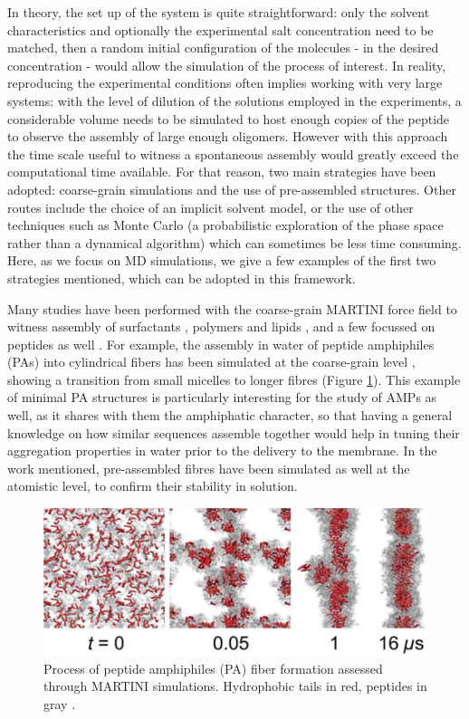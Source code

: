 In theory, the set up of the system is quite straightforward: only the solvent characteristics and optionally the experimental salt concentration need to be matched, then a random initial configuration of the molecules - in the desired concentration - would allow the simulation of the process of interest.
%
In reality, reproducing the experimental conditions often implies working with very large systems: with the level of dilution of the solutions employed in the experiments, a considerable volume needs to be simulated to host enough copies of the peptide to observe the assembly of large enough oligomers.
%
However with this approach the time scale useful to witness a spontaneous assembly would greatly exceed the computational time available. For that reason, two main strategies have been adopted: coarse-grain simulations and the use of pre-assembled structures. Other routes include the choice of an implicit solvent model, or the use of other techniques such as Monte Carlo (a probabilistic exploration of the phase space rather than a dynamical algorithm) which can sometimes be less time consuming. Here, as we focus on MD simulations, we give a few examples of the first two strategies mentioned, which can be adopted in this framework.

Many studies have been performed with the coarse-grain MARTINI force field to witness assembly of surfactants \cite{Wu2012}, polymers \cite{Wang2012poly,Bochicchio2017} and lipids \cite{Lee2011,Brocos2012}, and a few focussed on peptides as well \cite{Guo2012,Seo2012}.
%
For example, the assembly in water of peptide amphiphiles (PAs) into cylindrical fibers has been simulated at the coarse-grain level \cite{Lee2012}, showing a transition from small micelles to longer fibres (Figure \ref{fig:PA}). This example of minimal PA structures is particularly interesting for the study of AMPs as well, as it shares with them the amphiphatic character, so that having a general knowledge on how similar sequences assemble together would help in tuning their aggregation properties in water prior to the delivery to the membrane.
%
In the work mentioned, pre-assembled fibres have been simulated as well at the atomistic level, to confirm their stability in solution.
%
\begin{figure}[t!]
\centering
\includegraphics[width=0.8\linewidth]{2methods/pics/PA.jpeg}
%
\caption[Peptide amphiphiles assembly through MARTINI simulations]{Process of peptide amphiphiles (PA) fiber formation assessed through MARTINI simulations. Hydrophobic tails in red, peptides in gray \cite{Lee2012}.}
\label{fig:PA}
\end{figure}


